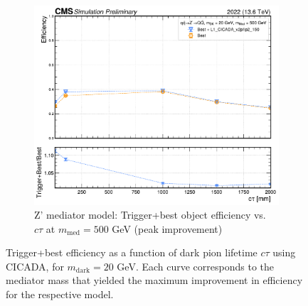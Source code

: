 \begin{figure}[H]
\begin{subfigure}[t]{0.45\textwidth}
    \includegraphics[width=\linewidth]{images/L1/ad_1D_schan/trigeffplots1D_L1_efftype-trigplusbest_s-channel_mDark-20_mMed-500_L1_CICADA_v2p1p2_150_study_cloppear.pdf}
    \caption{Z' mediator model: Trigger+best object efficiency vs.\ $c\tau$ at $m_\mathrm{med} = 500$ GeV (peak improvement)}
    \label{fig:cicada_eff1D_schan}
  \end{subfigure}

  \caption{Trigger+best efficiency as a function of dark pion lifetime $c\tau$ using CICADA, for $m_\mathrm{dark} = 20$ GeV. Each curve corresponds to the mediator mass that yielded the maximum improvement in efficiency for the respective model.}
  \label{fig:cicada_eff1D}
\end{figure}


